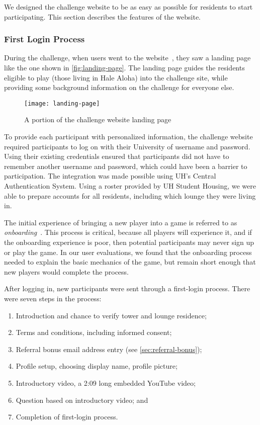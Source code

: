 We designed the challenge website to be as easy as possible for residents to start participating. This section describes the features of the website.


\subsubsection{First Login Process}
\label{sec:first-login}

During the challenge, when users went to the website~\cite{kukuicup-website}, they saw a landing page like the one shown in \autoref{fig:landing-page}. The landing page guides the residents eligible to play (those living in Hale Aloha) into the challenge site, while providing some background information on the challenge for everyone else.

\begin{figure}[htbp]
	\centering
		\texttt{[image: landing-page]}
		\caption{A portion of the challenge website landing page}
\label{fig:landing-page}
\end{figure}

To provide each participant with personalized information, the challenge website required participants to log on with their University of \Hawaii username and password. Using their existing credentials ensured that participants did not have to remember another username and password, which could have been a barrier to participation. The integration was made possible using UH's Central Authentication System. Using a roster provided by UH Student Housing, we were able to prepare accounts for all residents, including which lounge they were living in.

The initial experience of bringing a new player into a game is referred to as \emph{onboarding}~\cite{zichermann2011gamification}. This process is critical, because all players will experience it, and if the onboarding experience is poor, then potential participants may never sign up or play the game. In our user evaluations, we found that the onboarding process needed to explain the basic mechanics of the game, but remain short enough that new players would complete the process.

After logging in, new participants were sent through a first-login process. There were seven steps in the process:

\begin{enumerate}
	\item Introduction and chance to verify tower and lounge residence;
	\item Terms and conditions, including informed consent;
	\item Referral bonus email address entry (see \autoref{sec:referral-bonus});
	\item Profile setup, choosing display name, profile picture;
	\item Introductory video, a 2:09 long embedded YouTube video;
	\item Question based on introductory video; and
	\item Completion of first-login process.
\end{enumerate}


